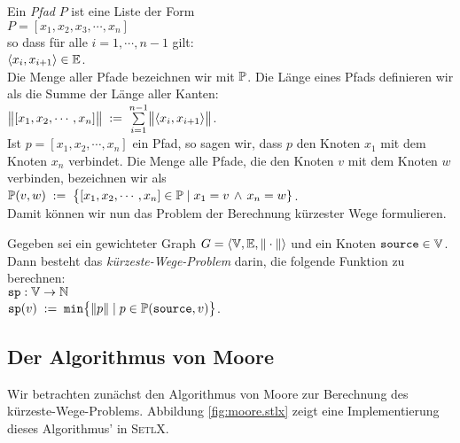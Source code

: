\noindent
Ein \emph{Pfad} $P$ ist eine Liste der Form \\[0.2cm]
\hspace*{1.3cm} $P = [ x_1, x_2, x_3, \cdots, x_n ]$ \\[0.2cm]
so dass f\"ur alle $i = 1, \cdots, n-1$ gilt: \\[0.2cm]
\hspace*{1.3cm} $\pair(x_i,x_{i+1}) \in \edges$. \\[0.2cm]
Die Menge aller Pfade bezeichnen wir mit ${\mathbb P}$.
Die L\"ange eines Pfads definieren wir als die Summe der L\"ange aller Kanten:
\\[0.2cm]
\hspace*{1.3cm} $\Weight{[x_1,x_2, \cdots, x_n]} \df \sum\limits_{i=1}^{n-1} \Weight{\pair(x_i,x_{i+1})}$. \\[0.2cm]
Ist $p = [x_1, x_2, \cdots, x_n]$ ein Pfad, so sagen wir, dass $p$ den Knoten $x_1$ mit dem
Knoten $x_n$ verbindet.   Die Menge alle Pfade, die den Knoten $v$ mit dem Knoten $w$
verbinden, bezeichnen wir als \\[0.2cm]
\hspace*{1.3cm} 
 ${\mathbb P}(v,w) \;:=\; \bigl\{ [x_1, x_2, \cdots, x_n] \in {\mathbb P} \mid x_1 = v \,\wedge\, x_n = w \}$.
\\[0.2cm]
Damit k\"onnen wir nun das Problem der Berechnung k\"urzester Wege formulieren.

\begin{Definition} \lb
  Gegeben sei ein gewichteter Graph 
  $G = \langle {\mathbb V}, {\mathbb E}, \|\cdot\| \rangle$ 
  und ein  Knoten $\mbox{\tt source} \in {\mathbb V}$.  Dann besteht das 
  {\em k\"urzeste-Wege-Problem}  darin, die folgende Funktion zu berechnen: \\[0.2cm]
  \hspace*{1.3cm} $\mbox{\tt sp}: {\mathbb V} \rightarrow {\mathbb N}$ \\[0.1cm]
  \hspace*{1.3cm} $\mbox{\tt sp}(v) \;:=\; \mathtt{min}\bigl\{ \|p\| \mid p \in {\mathbb P}(\mbox{\tt source},v) \bigr\}$.
  \conclude  
\end{Definition}

\subsection[Moore's Algorithm]{Der Algorithmus von Moore}
Wir betrachten zun\"achst den Algorithmus von Moore \cite{moore:59} zur Berechnung des k\"urzeste-Wege-Problems.
Abbildung \ref{fig:moore.stlx} zeigt eine Implementierung dieses Algorithmus' in \textsc{SetlX}.

